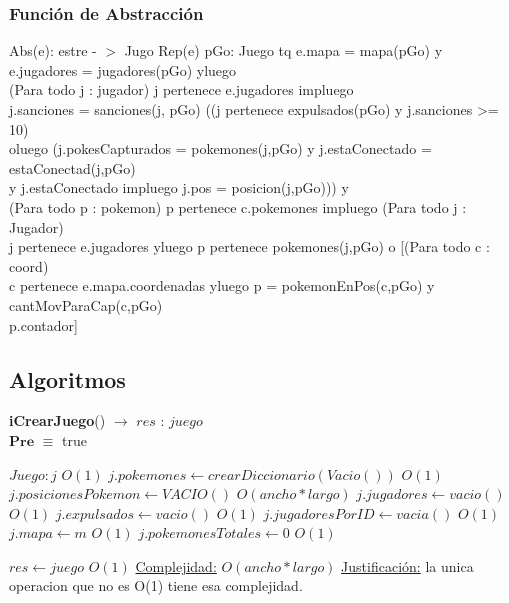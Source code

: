 \begin{Representacion}
\begin{enumerate}
	\end{enumerate}
	
\subsubsection{Funci\'on de Abstracci\'on}	
	Abs(e): estre - $>$ Jugo {Rep(e)} 
 pGo: Juego tq e.mapa = mapa(pGo) y e.jugadores = jugadores(pGo) yluego \\
 (Para todo j : jugador) j pertenece e.jugadores impluego 
 \\ j.sanciones = sanciones(j, pGo) ((j pertenece expulsados(pGo) y j.sanciones >= 10)\\
 oluego (j.pokesCapturados = pokemones(j,pGo) y j.estaConectado = estaConectad(j,pGo) \\
 y j.estaConectado impluego j.pos = posicion(j,pGo))) y \\
 (Para todo p : pokemon) p pertenece c.pokemones impluego (Para todo j : Jugador) \\
 j pertenece e.jugadores yluego p pertenece pokemones(j,pGo) o [(Para todo c : coord)\\
 c pertenece e.mapa.coordenadas yluego p = pokemonEnPos(c,pGo) y cantMovParaCap(c,pGo)\\
 p.contador]
\end{Representacion}


\subsection{Algoritmos}

\begin{algorithm}[H]{\textbf{iCrearJuego}() $\to$ $res$ : $juego$}
	{\\ $\textbf{Pre}$ $\equiv$ true}
	\begin{algorithmic}

		\State $Juego : j$ \Comment $O(1)$
		\State $j.pokemones \gets crearDiccionario(Vacio())$ \Comment $O(1)$
		\State $j.posicionesPokemon \gets VACIO()$ \Comment $O(ancho * largo)$
		\State $j.jugadores \gets vacio()$ \Comment $O(1)$
		\State $j.expulsados \gets vacio()$ \Comment $O(1)$
		\State $j.jugadoresPorID \gets vacia()$ \Comment $O(1)$
		\State $j.mapa \gets m$ \Comment $O(1)$
		\State $j.pokemonesTotales \gets 0$ \Comment $O(1)$

		\State $res \gets juego$ \Comment $O(1)$
		\medskip
		\Statex \underline{Complejidad:} $O(ancho * largo)$
		\Statex \underline{Justificación:} la unica operacion que no es  O(1) tiene esa complejidad.

    \end{algorithmic}
\end{algorithm}

